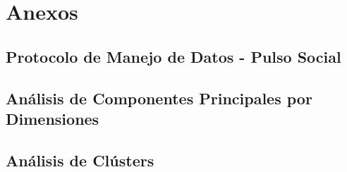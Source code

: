 \documentclass[11pt,oneside,a4paper,english,french,spanish,brazil]{abntex2}
\begin{document}
             \part*{Anexos}
             \begin{anexosenv}
             
             \chapter{Protocolo de Manejo de Datos - Pulso Social}\label{anex:anexo1}
                
             
             
            \chapter{Análisis de Componentes Principales por Dimensiones}\label{anex:anexo1}
                
                
            
            \chapter{Análisis de Clústers}\label{anex:anexo1}
                
                
 
             \end{anexosenv}


            \printindex



\end{document}
